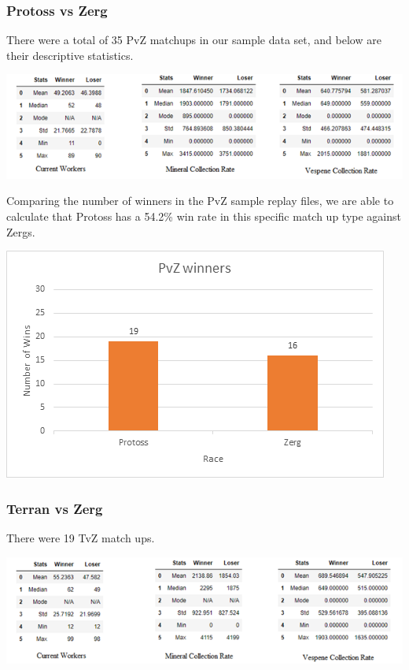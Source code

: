 \documentclass[a4paper,12pt]{report}
\begin{document}
\subsubsection{Protoss vs Zerg}
There were a total of 35 PvZ matchups in our sample data set, and below are their descriptive statistics. 

\begin{center}
    \captionsetup{type=figure}
    \includegraphics[width=.9\linewidth]{media/workersCollectionPvZ.png}
\end{center}

Comparing the number of winners in the PvZ sample replay files, we are able to calculate that Protoss has a 54.2\% win rate in this specific match up type against Zergs.

\begin{center}
    \captionsetup{type=figure}
    \includegraphics[width=.9\linewidth]{media/PvZwinners.png}
\end{center}

\subsubsection{Terran vs Zerg}
There were 19 TvZ match ups.

\begin{center}
    \captionsetup{type=figure}
    \includegraphics[width=.9\linewidth]{media/WorkersCollectionTvZ.png}
\end{center}
\end{document}
